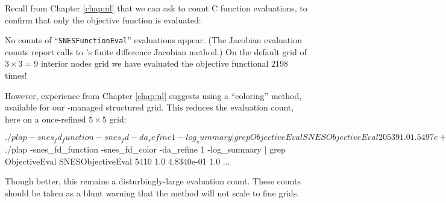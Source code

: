 Recall from Chapter \ref{chap:nl} that we can ask \PETSc to count C function evaluations, to confirm that only the objective function is evaluated:
No counts of ``\texttt{SNESFunctionEval}'' evaluations appear.  (The Jacobian evaluation counts report calls to \PETSc's finite difference Jacobian method.)  On the default grid of $3=9$ interior nodes grid we have evaluated the objective functional 2198 times!

However, experience from Chapter \ref{chap:nl} suggests using a ``coloring'' method, available for our \pDMDA-managed structured grid.  This reduces the evaluation count, here on a once-refined $5 $ grid:
\begin{cline}
$ ./plap -snes_fd_function -snes_fd -da_refine 1 -log_summary | grep ObjectiveEval
SNESObjectiveEval   20539 1.0 1.5497e+00 1.0 ...
$ ./plap -snes_fd_function -snes_fd_color -da_refine 1 -log_summary | grep ObjectiveEval
SNESObjectiveEval    5410 1.0 4.8340e-01 1.0 ...
\end{cline}
\label{page:of:badEvalcount}
Though better, this remains a disturbingly-large evaluation count.  These counts should be taken as a blunt warning that the method will not scale to fine grids.

